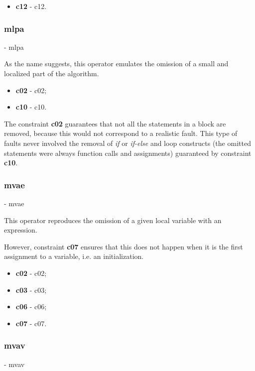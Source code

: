 	\begin{itemize}
		\item \textbf{\acs{c12}} - \Acl{c12}.
	\end{itemize}

	\subsubsection{\textbf{\acs{mlpa}}} - \Acl{mlpa}

	As the name suggests, this operator emulates the omission of a small and localized part of the algorithm.

	\begin{itemize}
		\item \textbf{\acs{c02}} - \Acl{c02};
		\item \textbf{\acs{c10}} - \Acl{c10}.
	\end{itemize}

	The constraint \textbf{\ac{c02}} guarantees that not all the statements in a block are removed, because this would not correspond to a realistic fault. This type of faults never involved the removal of \textit{if} or \textit{if-else} and loop constructs (the omitted statements were always function calls and assignments) guaranteed by constraint \textbf{\ac{c10}}.

	\subsubsection{\textbf{\acs{mvae}}} - \Acl{mvae}

	This operator reproduces the omission of a given local variable with an expression.

	However, constraint \textbf{\acs{c07}} ensures that this does not happen when it is the first assignment to a variable, i.e. an initialization.

	\begin{itemize}
		\item \textbf{\acs{c02}} - \Acl{c02};
		\item \textbf{\acs{c03}} - \Acl{c03};
		\item \textbf{\acs{c06}} - \Acl{c06};
		\item \textbf{\acs{c07}} - \Acl{c07}.
	\end{itemize}

	\subsubsection{\textbf{\acs{mvav}}} - \Acl{mvav}

